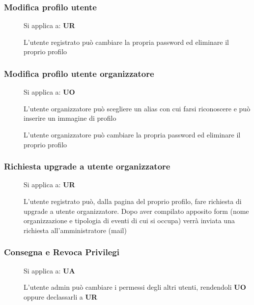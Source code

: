 \documentclass{article}
\let\origthesubsubsection\thesubsubsection
\begin{document}
\subsubsection{Modifica profilo utente} \label{rf_10}
\begin{description}
    \item[] Si applica a: \textbf{UR}
    \item[] L'utente registrato può cambiare la propria password ed eliminare il proprio profilo
\end{description}
\subsubsection{Modifica profilo utente organizzatore} \label{rf_11}
\begin{description}
    \item[] Si applica a: \textbf{UO}
    \item[] L'utente organizzatore può scegliere un alias con cui farsi riconoscere e può inserire un immagine di profilo
    \item[] L'utente organizzatore può cambiare la propria password ed eliminare il proprio profilo
\end{description}
\subsubsection{Richiesta upgrade a utente organizzatore} \label{rf_12}
\begin{description}
    \item[] Si applica a: \textbf{UR}
    \item[] L'utente registrato può, dalla pagina del proprio profilo, fare richiesta di upgrade a utente organizzatore. Dopo aver compilato apposito form (nome organizzazione e tipologia di eventi di cui si occupa) verrà inviata una richiesta all'amministratore (mail)
\end{description}
\subsubsection{Consegna e Revoca Privilegi} \label{rf_13}
\begin{description}
    \item[] Si applica a: \textbf{UA}
    \item[] L'utente admin può cambiare i permessi degli altri utenti, rendendoli \textbf{UO} oppure declassarli a \textbf{UR}
\end{description}
\clearpage
\renewcommand\thesubsubsection{\origthesubsubsection}
\end{document}
